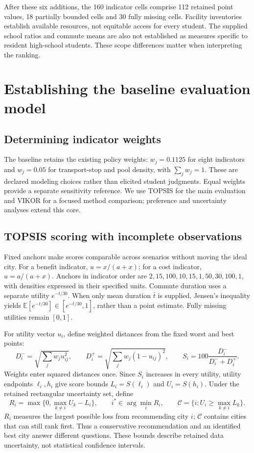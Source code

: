 \documentclass[11pt]{article}
\begin{document}
After these six additions, the 160 indicator cells comprise 112 retained point values, 18 partially bounded cells and 30 fully missing cells. Facility inventories establish available resources, not equitable access for every student. The supplied school ratios and commute means are also not established as measures specific to resident high-school students. These scope differences matter when interpreting the ranking.

\section{Establishing the baseline evaluation model}
\subsection{Determining indicator weights}
The baseline retains the existing policy weights: $w_j=0.1125$ for eight indicators and $w_j=0.05$ for transport-stop and pool density, with $\sum_jw_j=1$. These are declared modeling choices rather than elicited student judgments. Equal weights provide a separate sensitivity reference. We use TOPSIS for the main evaluation and VIKOR for a focused method comparison; preference and uncertainty analyses extend this core.

\subsection{TOPSIS scoring with incomplete observations}
Fixed anchors make scores comparable across scenarios without moving the ideal city. For a benefit indicator, $u=x/(a+x)$; for a cost indicator, $u=a/(a+x)$. Anchors in indicator order are $2,15,100,10,15,1,50,30,100,1$, with densities expressed in their specified units. Commute duration uses a separate utility $e^{-t/30}$. When only mean duration $\bar t$ is supplied, Jensen's inequality yields $\mathbb E[e^{-t/30}]\in[e^{-\bar t/30},1]$, rather than a point estimate. Fully missing utilities remain $[0,1]$.

For utility vector $u_i$, define weighted distances from the fixed worst and best points:
\begin{equation}
 D_i^- =\sqrt{\sum_jw_ju_{ij}^2},\qquad D_i^+=\sqrt{\sum_jw_j(1-u_{ij})^2},\qquad S_i=100\frac{D_i^-}{D_i^-+D_i^+}.
\end{equation}
Weights enter squared distances once. Since $S_i$ increases in every utility, utility endpoints $\ell_i,h_i$ give score bounds $L_i=S(\ell_i)$ and $U_i=S(h_i)$. Under the retained rectangular uncertainty set, define
\begin{equation}
 R_i=\max\{0,\max_{k\ne i}U_k-L_i\},\qquad i^*\in\arg\min_i R_i,
 \qquad \mathcal C=\{i:U_i\geq\max_{k\ne i}L_k\}.
\end{equation}
$R_i$ measures the largest possible loss from recommending city $i$; $\mathcal C$ contains cities that can still rank first. Thus a conservative recommendation and an identified best city answer different questions. These bounds describe retained data uncertainty, not statistical confidence intervals.
\end{document}
